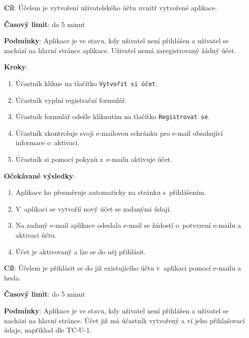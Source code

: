 
\vspace{1em}

\textbf{Cíl}: Účelem je vytvoření uživatelského účtu uvnitř vytvořené aplikace.

\textbf{Časový limit}: do 5 minut

\textbf{Podmínky}: Aplikace je ve stavu, kdy uživatel není přihlášen a uživatel se nachází na hlavní stránce aplikace. Uživatel nemá zaregistrovaný žádný účet.

\textbf{Kroky}:

\begin{enumerate}[leftmargin=1.4cm]
    \item Účastník klikne na tlačítko \verb|Vytvořit si účet|.
    \item Účastník vyplní registrační formulář.
    \item Účastník formulář odešle kliknutím na tlačítko \verb|Registrovat se|.
    \item Účastník zkontroluje svoji e-mailovou schránku pro e-mail obsahující informace o~aktivaci.
    \item Účastník si pomocí pokynů z~e-mailu aktivuje účet.
\end{enumerate}

\textbf{Očekávané výsledky}:

\begin{enumerate}[leftmargin=1.4cm]
    \item Aplikace ho přesměruje automaticky na stránku s~přihlášením.
    \item V~aplikaci se vytvořil nový účet se zadanými údaji.
    \item Na zadaný e-mail aplikace odeslala e-mail se žádostí o~potvrzení e-mailu a aktivaci účtu.
    \item Účet je aktivovaný a lze se do něj přihlásit.
\end{enumerate}


\vspace{1em}

\textbf{Cíl}: Účelem je přihlásit se do již existujícího účtu v~aplikaci pomocí e-mailu a hesla.

\textbf{Časový limit}: do 5 minut

\textbf{Podmínky}: Aplikace je ve stavu, kdy uživatel není přihlášen a uživatel se nachází na hlavní stránce. Účet již má účastník vytvořený a ví jeho přihlašovací údaje, například dle TC-U-1.

